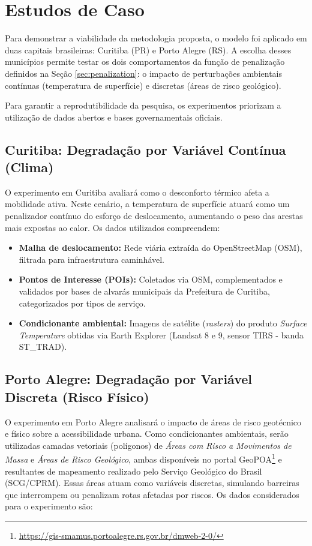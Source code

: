 \section{Estudos de Caso}
\label{sec:case_studies}

Para demonstrar a viabilidade da metodologia proposta, o modelo foi aplicado em duas capitais brasileiras: Curitiba (PR) e Porto Alegre (RS). A escolha desses municípios permite testar os dois comportamentos da função de penalização definidos na Seção \ref{sec:penalization}: o impacto de perturbações ambientais contínuas (temperatura de superfície) e discretas (áreas de risco geológico).

Para garantir a reprodutibilidade da pesquisa, os experimentos priorizam a utilização de dados abertos e bases governamentais oficiais.

\subsection{Curitiba: Degradação por Variável Contínua (Clima)}
O experimento em Curitiba avaliará como o desconforto térmico afeta a mobilidade ativa. Neste cenário, a temperatura de superfície atuará como um penalizador contínuo do esforço de deslocamento, aumentando o peso das arestas mais expostas ao calor. Os dados utilizados compreendem:

\begin{itemize}
    \item \textbf{Malha de deslocamento:} Rede viária extraída do OpenStreetMap (OSM), filtrada para infraestrutura caminhável.
    \item \textbf{Pontos de Interesse (POIs):} Coletados via OSM, complementados e validados por bases de alvarás municipais da Prefeitura de Curitiba, categorizados por tipos de serviço.
    \item \textbf{Condicionante ambiental:} Imagens de satélite (\textit{rasters}) do produto \textit{Surface Temperature} obtidas via Earth Explorer (Landsat 8 e 9, sensor TIRS - banda ST\_TRAD).
\end{itemize}

\subsection{Porto Alegre: Degradação por Variável Discreta (Risco Físico)}
O experimento em Porto Alegre analisará o impacto de áreas de risco geotécnico e físico sobre a acessibilidade urbana. Como condicionantes ambientais, serão utilizadas camadas vetoriais (polígonos) de \textit{Áreas com Risco a Movimentos de Massa} e \textit{Áreas de Risco Geológico}, ambas disponíveis no portal GeoPOA\footnote{\url{https://gis-smamus.portoalegre.rs.gov.br/dmweb-2-0/}} e resultantes de mapeamento realizado pelo Serviço Geológico do Brasil (SCG/CPRM). Essas áreas atuam como variáveis discretas, simulando barreiras que interrompem ou penalizam rotas afetadas por riscos. Os dados considerados para o experimento são:

